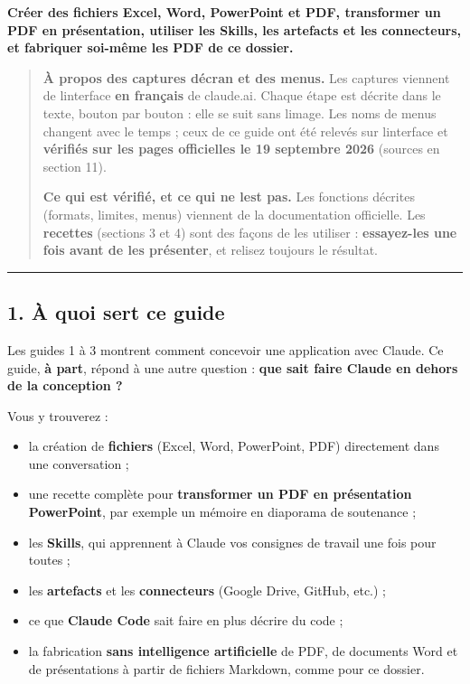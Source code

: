 \documentclass[
  french,
  11pt,
  a4paper,
]{article}
\providecommand{\tightlist}{%
  \setlength{\itemsep}{0pt}\setlength{\parskip}{0pt}}
\begin{document}
\textbf{Créer des fichiers Excel, Word, PowerPoint et PDF, transformer
un PDF en présentation, utiliser les Skills, les artefacts et les
connecteurs, et fabriquer soi-même les PDF de ce dossier.}

\begin{quote}
\textbf{À propos des captures d\textquotesingle écran et des menus.} Les
captures viennent de l\textquotesingle interface \textbf{en français} de
claude.ai. Chaque étape est décrite dans le texte, bouton par bouton :
elle se suit sans l\textquotesingle image. Les noms de menus changent
avec le temps ; ceux de ce guide ont été relevés sur
l\textquotesingle interface et \textbf{vérifiés sur les pages
officielles le 19 septembre 2026} (sources en section 11).

\textbf{Ce qui est vérifié, et ce qui ne l\textquotesingle est pas.} Les
fonctions décrites (formats, limites, menus) viennent de la
documentation officielle. Les \textbf{recettes} (sections 3 et 4) sont
des façons de les utiliser : \textbf{essayez-les une fois avant de les
présenter}, et relisez toujours le résultat.
\end{quote}

\begin{center}\rule{0.5\linewidth}{0.5pt}\end{center}

\subsection{1. À quoi sert ce guide}\label{1-uxe0-quoi-sert-ce-guide}

Les guides 1 à 3 montrent comment concevoir une application avec Claude.
Ce guide, \textbf{à part}, répond à une autre question : \textbf{que
sait faire Claude en dehors de la conception ?}

Vous y trouverez :

\begin{itemize}
\tightlist
\item
  la création de \textbf{fichiers} (Excel, Word, PowerPoint, PDF)
  directement dans une conversation ;
\item
  une recette complète pour \textbf{transformer un PDF en présentation
  PowerPoint}, par exemple un mémoire en diaporama de soutenance ;
\item
  les \textbf{Skills}, qui apprennent à Claude vos consignes de travail
  une fois pour toutes ;
\item
  les \textbf{artefacts} et les \textbf{connecteurs} (Google Drive,
  GitHub, etc.) ;
\item
  ce que \textbf{Claude Code} sait faire en plus
  d\textquotesingle écrire du code ;
\item
  la fabrication \textbf{sans intelligence artificielle} de PDF, de
  documents Word et de présentations à partir de fichiers Markdown,
  comme pour ce dossier.
\end{itemize}
\end{document}
